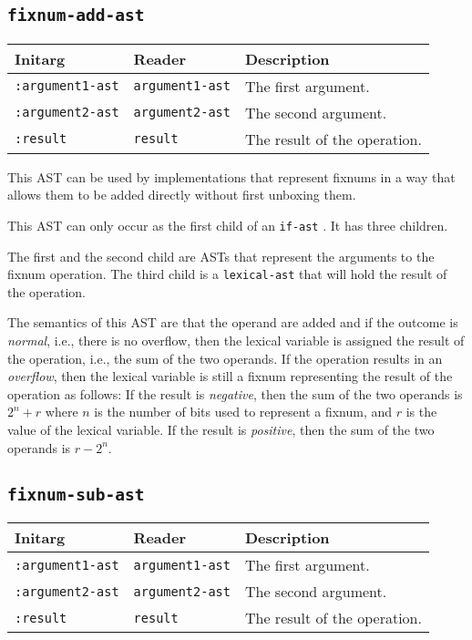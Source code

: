 \subsection{\texttt{fixnum-add-ast}}
\label{fixnum-add-ast}

\begin{tabular}{|l|l|l|}
\hline
Initarg & Reader & Description\\
\hline\hline
\texttt{:argument1-ast} & \texttt{argument1-ast} & The first argument.\\
\hline
\texttt{:argument2-ast} & \texttt{argument2-ast} & The second argument.\\
\hline
\texttt{:result} & \texttt{result} & The result of the operation.\\
\hline
\end{tabular}

This AST can be used by implementations that represent fixnums in a
way that allows them to be added directly without first unboxing
them.  

This AST can only occur as the first child of an \texttt{if-ast}
.  It has three children.

The first and the second child are ASTs that represent the arguments
to the fixnum operation.  The third child is a
\texttt{lexical-ast} that will hold the result of the operation.

The semantics of this AST are that the operand are added and if the
outcome is \emph{normal}, i.e., there is no overflow, then the lexical
variable is assigned the result of the operation, i.e., the sum of the
two operands.  If the operation results in an \emph{overflow}, then
the lexical variable is still a fixnum representing the result of the
operation as follows:  If the result is \emph{negative}, then the
sum of the two operands is $2^n + r$ where $n$ is the number of bits
used to represent a fixnum, and $r$ is the value of the lexical
variable.  If the result is \emph{positive}, then the sum of the two
operands is $r - 2^n$.

\subsection{\texttt{fixnum-sub-ast}}
\label{fixnum-sub-ast}

\begin{tabular}{|l|l|l|}
\hline
Initarg & Reader & Description\\
\hline\hline
\texttt{:argument1-ast} & \texttt{argument1-ast} & The first argument.\\
\hline
\texttt{:argument2-ast} & \texttt{argument2-ast} & The second argument.\\
\hline
\texttt{:result} & \texttt{result} & The result of the operation.\\
\hline
\end{tabular}

